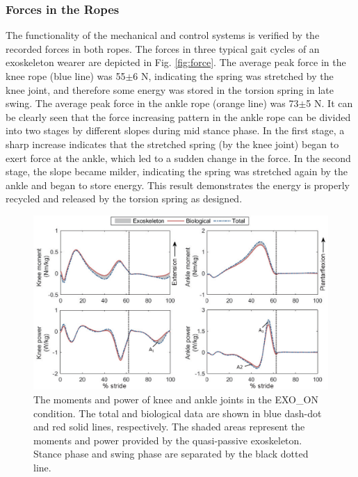 \documentclass[10pt]{asme2ej}
\begin{document}
\subsubsection{Forces in the Ropes}
The functionality of the mechanical and control systems is verified by the recorded forces in both ropes.
The forces in three typical gait cycles of an exoskeleton wearer are depicted in Fig. \ref{fig:force}.
The average peak force in the knee rope (blue line) was 55$\pm$6 N, indicating the spring was stretched by the knee joint, and therefore some energy was stored in the torsion spring in late swing.
The average peak force in the ankle rope (orange line) was 73$\pm$5 N.
It can be clearly seen that the force increasing pattern in the ankle rope can be divided into two stages by different slopes during mid stance phase.
In the first stage, a sharp increase indicates that the stretched spring (by the knee joint) began to exert force at the ankle, which led to a sudden change in the force.
In the second stage, the slope became milder, indicating the spring was stretched again by the ankle and began to store energy.
This result demonstrates the energy is properly recycled and released by the torsion spring as designed.

\begin{figure}[t]
	\centering
	\includegraphics[width=17cm]{exo.eps}
	\caption{The moments and power of knee and ankle joints in the EXO\_ON condition.
	The total and biological data are shown in blue dash-dot and red solid lines, respectively.
	The shaded areas represent the moments and power provided by the quasi-passive exoskeleton.
	Stance phase and swing phase are separated by the black dotted line.}
	\label{fig:exo}
\end{figure}
\end{document}
